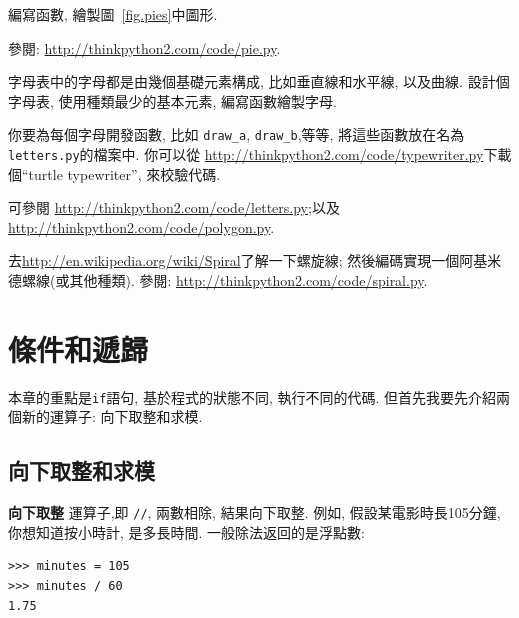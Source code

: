 \documentclass[10pt]{book}
\begin{document}
\begin{exercise}

編寫函數, 繪製圖~\ref{fig.pies}中圖形. 

參閱: \url{http://thinkpython2.com/code/pie.py}.

\end{exercise}

\begin{exercise}

字母表中的字母都是由幾個基礎元素構成, 比如垂直線和水平線, 以及曲線. 
設計個字母表, 使用種類最少的基本元素, 編寫函數繪製字母. 

你要為每個字母開發函數, 比如 \verb"draw_a", \verb"draw_b",等等, 
將這些函數放在名為{\tt letters.py}的檔案中. 
你可以從 \url{http://thinkpython2.com/code/typewriter.py}下載個``turtle typewriter'', 
來校驗代碼. 

可參閱 \url{http://thinkpython2.com/code/letters.py};以及
\url{http://thinkpython2.com/code/polygon.py}.

\end{exercise}

\begin{exercise}

去\url{http://en.wikipedia.org/wiki/Spiral}了解一下螺旋線;
然後編碼實現一個阿基米德螺線(或其他種類). 
參閱: \url{http://thinkpython2.com/code/spiral.py}.

\end{exercise}


\chapter{條件和遞歸}

本章的重點是{\tt if}語句, 
基於程式的狀態不同, 執行不同的代碼. 
但首先我要先介紹兩個新的運算子: 向下取整和求模. 

\section{向下取整和求模}

{\bf 向下取整} 運算子,即 \verb"//", 
兩數相除, 結果向下取整. 
例如, 假設某電影時長105分鐘, 你想知道按小時計, 是多長時間. 
一般除法返回的是浮點數:

\begin{verbatim}
>>> minutes = 105
>>> minutes / 60
1.75
\end{verbatim}
\end{document}
